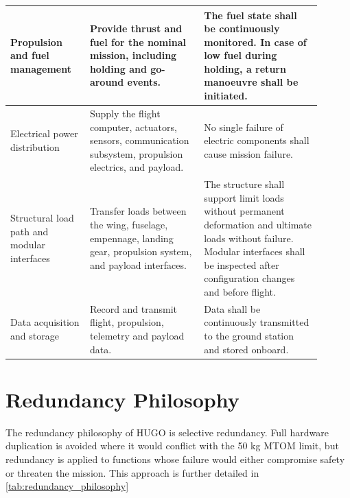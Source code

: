 \begin{longtable}{|p{0.23\linewidth}|p{0.33\linewidth}|p{0.34\linewidth}|}
    Propulsion and fuel management &
    Provide thrust and fuel for the nominal mission, including holding and go-around events. &
    The fuel state shall be continuously monitored. In case of low fuel during holding, a return manoeuvre shall be initiated. \\
    \hline

    Electrical power distribution &
    Supply the flight computer, actuators, sensors, communication subsystem, propulsion electrics, and payload. &
    No single failure of electric components shall cause mission failure. \\
    \hline

    Structural load path and modular interfaces &
    Transfer loads between the wing, fuselage, empennage, landing gear, propulsion system, and payload interfaces. &
    The structure shall support limit loads without permanent deformation and ultimate loads without failure. Modular interfaces shall be inspected after configuration changes and before flight. \\
    \hline

    Data acquisition and storage &
    Record and transmit flight, propulsion, telemetry and payload data. &
    Data shall be continuously transmitted to the ground station and stored onboard. \\
    \hline

\end{longtable}

\section{Redundancy Philosophy}
\label{sec:redundancy}

The redundancy philosophy of HUGO is selective redundancy. Full hardware duplication is avoided where it would conflict with the 50 kg MTOM limit, but redundancy is applied to functions whose failure would either compromise safety or threaten the mission. This approach is further detailed in \autoref{tab:redundancy_philosophy}

